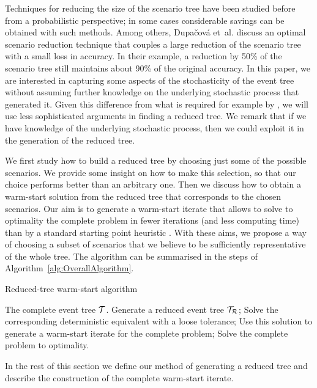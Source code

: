 Techniques for reducing the size of the scenario tree have been studied 
before from a probabilistic perspective; in some cases considerable 
savings can be obtained with such methods. Among others, 
Dupa\v{c}ov{\'a} et~al. \cite{Dupacova} discuss an optimal scenario 
reduction technique that couples a large reduction of the scenario 
tree with a small loss in accuracy. In their example, a reduction by 
50\% of the scenario tree still maintains about 90\% of the original 
accuracy.
In this paper, we are interested in capturing some aspects of the 
stochasticity of the event tree without assuming further knowledge on 
the underlying stochastic process that generated it. Given this difference 
from what is required for example by \cite{Dupacova}, we will use less 
sophisticated arguments in finding a reduced tree.
We remark that if we have knowledge of the underlying stochastic process,
then we could exploit it in the generation of the reduced tree.

We first study how to build a reduced tree by choosing just 
some of the possible scenarios. We provide some insight on how to make 
this selection, so that our choice performs better than an arbitrary 
one.
Then we discuss how to obtain a warm-start solution from the reduced 
tree that corresponds to the chosen scenarios.
Our aim is to generate a warm-start iterate that allows to solve to 
optimality the complete problem in fewer iterations (and less computing 
time) than by a standard starting point heuristic \cite{Mehrotra92}.
With these aims, we propose a way of choosing a subset of scenarios 
that we believe to be sufficiently representative of the whole tree.
The algorithm can be summarised in the steps of
Algorithm~\ref{alg:OverallAlgorithm}.
%
\begin{algorithm}[h]
  \caption{Reduced-tree warm-start algorithm}
  \begin{algorithmic}[1]  \label{alg:OverallAlgorithm}
    \REQUIRE The complete event tree $\mathcal{T}$.
    \STATE Generate a reduced event tree $\mathcal{T}_\mathcal{R}$;
    \STATE Solve the corresponding deterministic equivalent with a loose 
           tolerance;
    \STATE Use this solution to generate a warm-start iterate for the 
    complete problem;
    \STATE Solve the complete problem to optimality.
  \end{algorithmic}
\end{algorithm}

In the rest of this section we define our method of generating a 
reduced tree and describe the construction of the complete warm-start 
iterate.


